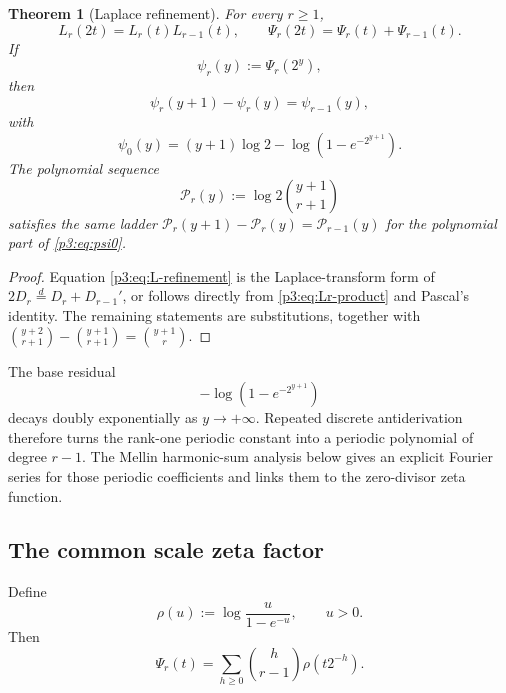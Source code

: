\documentclass[11pt,oneside]{article}
\newtheorem{theorem}{Theorem}[section]
\theoremstyle{definition}
\theoremstyle{remark}
\begin{document}
\begin{theorem}[Laplace refinement]\label{p3:thm:laplace-refinement}
For every $r\ge1$,
\begin{equation}\label{p3:eq:L-refinement}
  L_r(2t)=L_r(t)L_{r-1}(t),
  \qquad
  \Psi_r(2t)=\Psi_r(t)+\Psi_{r-1}(t).
\end{equation}
If
\begin{equation}\label{p3:eq:psi-r}
  \psi_r(y):=\Psi_r(2^y),
\end{equation}
then
\begin{equation}\label{p3:eq:discrete-antiderivative}
  \psi_r(y+1)-\psi_r(y)=\psi_{r-1}(y),
\end{equation}
with
\begin{equation}\label{p3:eq:psi0}
  \psi_0(y)=(y+1)\log2-\log(1-e^{-2^{y+1}}).
\end{equation}
The polynomial sequence
\begin{equation}\label{p3:eq:Pr-polynomial}
  \mathscr P_r(y):=\log2\binom{y+1}{r+1}
\end{equation}
satisfies the same ladder
$\mathscr P_r(y+1)-\mathscr P_r(y)=\mathscr P_{r-1}(y)$ for the polynomial part of \eqref{p3:eq:psi0}.
\end{theorem}

\begin{proof}
Equation \eqref{p3:eq:L-refinement} is the Laplace-transform form of
$2D_r\stackrel d=D_r+D_{r-1}'$, or follows directly from \eqref{p3:eq:Lr-product} and Pascal's identity.  The remaining statements are substitutions, together with
$\binom{y+2}{r+1}-\binom{y+1}{r+1}=\binom{y+1}{r}$.
\end{proof}

The base residual
\[
  -\log(1-e^{-2^{y+1}})
\]
decays doubly exponentially as $y\to+\infty$.  Repeated discrete antiderivation therefore turns the rank-one periodic constant into a periodic polynomial of degree $r-1$.  The Mellin harmonic-sum analysis \cite{p3:flajolet-mellin} below gives an explicit Fourier series for those periodic coefficients and links them to the zero-divisor zeta function.

\subsection{The common scale zeta factor}

Define
\begin{equation}\label{p3:eq:rho}
  \rho(u):=\log\frac{u}{1-e^{-u}},\qquad u>0.
\end{equation}
Then
\begin{equation}\label{p3:eq:Psi-harmonic-sum}
  \Psi_r(t)=\sum_{h\ge0}\binom h{r-1}\rho(t2^{-h}).
\end{equation}
\end{document}
